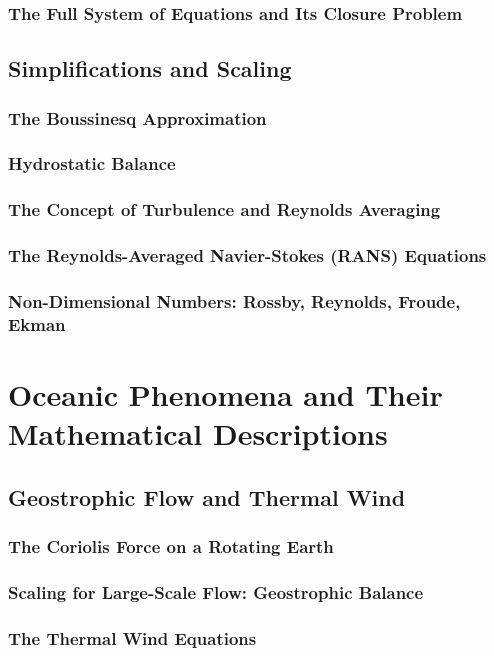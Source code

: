 \documentclass[12pt]{book}
\begin{document}
\section{The Full System of Equations and Its Closure Problem}

\chapter{Simplifications and Scaling}
\section{The Boussinesq Approximation}
\section{Hydrostatic Balance}
\section{The Concept of Turbulence and Reynolds Averaging}
\section{The Reynolds-Averaged Navier-Stokes (RANS) Equations}
\section{Non-Dimensional Numbers: Rossby, Reynolds, Froude, Ekman}

\part{Oceanic Phenomena and Their Mathematical Descriptions}
\chapter{Geostrophic Flow and Thermal Wind}
\section{The Coriolis Force on a Rotating Earth}
\section{Scaling for Large-Scale Flow: Geostrophic Balance}
\section{The Thermal Wind Equations}
\end{document}
